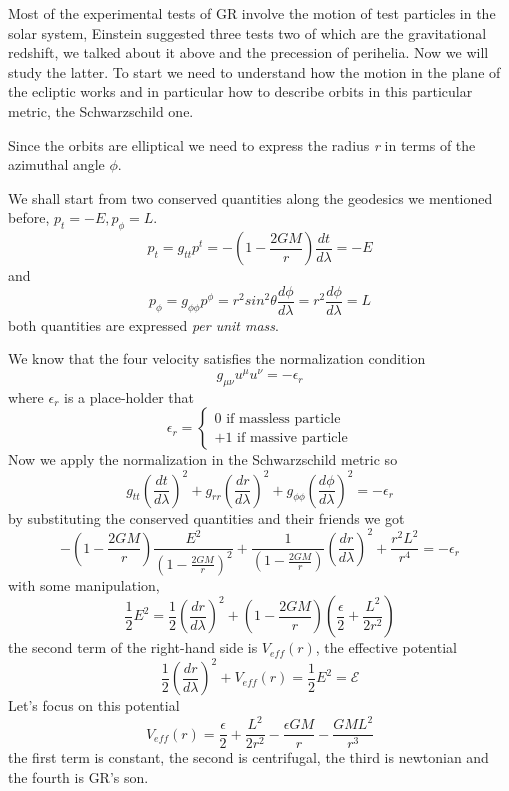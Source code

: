 Most of the experimental tests of GR involve the motion of test particles in the solar system, Einstein suggested three tests two of which are the gravitational redshift, we talked about it above and the precession of perihelia. Now we will study the latter. To start we need to understand how the motion in the plane of the ecliptic works and in particular how to describe orbits in this particular metric, the Schwarzschild one.\par
Since the orbits are elliptical we need to express the radius \emph{r} in terms of the azimuthal angle $\phi $. \par
We shall start from two conserved quantities along the geodesics we mentioned before, $p_{t} = - E, p_{\phi } = L$.
\[
p_{t } = g_{tt}p^{t} = - \left( 1- \frac{2GM}{r} \right) \frac{d t}{d \lambda } = - E
\]
and 
\[
p_{\phi } = g_{\phi \phi } p^{\phi } = r^{2} sin^{2}\theta \frac{d \phi }{d \lambda } = r^{2} \frac{d \phi }{d \lambda } = L
\]
both quantities are expressed \emph{per unit mass}.\par
We know that the four velocity satisfies the normalization condition
\[
g_{\mu \nu }u^{\mu }u^{\nu } = - \epsilon_{r}
\]
where $\epsilon_{r}$ is a place-holder that
\[
\epsilon _{r} = \begin{cases}
 0 \text{ if massless particle }\\
 +1 \text{ if massive particle}
\end{cases}
\]
Now we apply the normalization in the Schwarzschild metric so
\begin{equation}
g_{tt}\left( \frac{d t}{d \lambda } \right)^{2} + g_{rr}\left( \frac{d r}{d \lambda } \right)^{2} + g_{\phi \phi }\left( \frac{d \phi }{d \lambda } \right)^{2}  = - \epsilon_{r}
\end{equation}
by substituting the conserved quantities and their friends we got
\begin{equation}
-\left( 1- \frac{2GM}{r} \right) \frac{E^{2}}{\left( 1- \frac{2GM}{r} \right)^{2}} + \frac{1}{\left( 1 - \frac{2GM}{r} \right)}\left( \frac{d r}{d \lambda }\right)^{2} + \frac{r^{2}L^{2}}{r^{4}} = - \epsilon_{r}
\end{equation}
with some manipulation,
\begin{equation}
\frac{1}{2}E^{2} = \frac{1}{2} \left( \frac{d r}{d \lambda } \right)^{2} + \left( 1- \frac{2GM}{r} \right)\left( \frac{\epsilon }{2} + \frac{L^{2}}{2r^{2}} \right)
\end{equation}
the second term of the right-hand side is $V_{eff}\left( r \right)$, the effective potential
\begin{equation}
\frac{1}{2} \left( \frac{d r}{d \lambda } \right)^{2} + V_{eff}\left( r \right) = \frac{1}{2}E^{2} = \mathcal{E} 
\end{equation}
Let's focus on this potential
\begin{equation}\label{eq:566}
V_{eff}\left( r \right) = \frac{\epsilon }{2} + \frac{L^{2}}{2r^{2}}- \frac{\epsilon GM}{r} - \frac{GML^{2}}{r^{3}}
\end{equation}
the first term is constant, the second is centrifugal, the third is newtonian and the fourth is GR's son.\par

